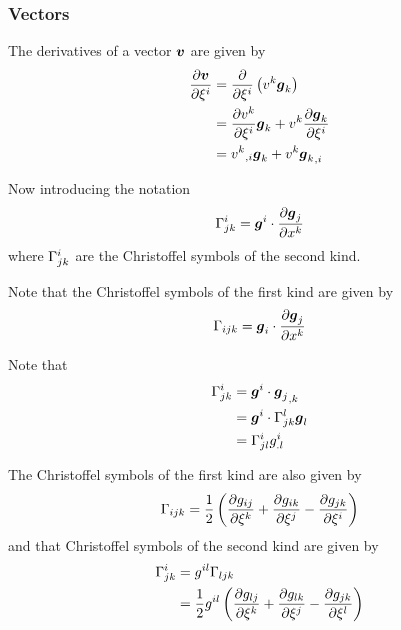 \subsubsection{Vectors}

The derivatives of a vector $\boldsymbol{v}$ are given by
\begin{equation}
  \begin{split}
     \dfrac{\partial \boldsymbol{v}}{\partial \xi^{i}}  &=
     \dfrac{\partial }{\partial \xi^{i}} \left( v^{k}\boldsymbol{g}_{k} \right) \\
    &=  \dfrac{\partial v^{k}}{\partial \xi^{i}} \boldsymbol{g}_{k}+v^{k} \dfrac{\partial \boldsymbol{g}_{k}}{\partial \xi^{i}}  \\
    &=  {v^{k}}_{,i} \boldsymbol{g}_{k}+v^{k} {\boldsymbol{g}_{k}}_{,i} 
  \end{split}
\end{equation}

Now introducing the notation
\begin{equation}
   \Gamma^{i}_{jk}  = \boldsymbol{g}^{i}\cdot \dfrac{\partial \boldsymbol{g}_{j}}{\partial x^{k}} 
\end{equation}
where $ \Gamma^{i}_{jk} $ are the Christoffel symbols of the second
kind. 

Note that the Christoffel symbols of the first kind are given by
\begin{equation}
   \Gamma_{ijk}  = \boldsymbol{g}_{i}\cdot \dfrac{\partial \boldsymbol{g}_{j}}{\partial x^{k}} 
\end{equation}

Note that
\begin{equation}
  \begin{split}
     \Gamma^{i}_{jk}  &= \boldsymbol{g}^{i}\cdot {\ensuremath{\boldsymbol{g}}_{j}}_{,k}  \\
    &=\boldsymbol{g}^{i}\cdot \Gamma^{l}_{jk} \boldsymbol{g}_{l} \\
    &=  \Gamma^{i}_{jl} g^{i}_{.l} 
  \end{split}
\end{equation}

The Christoffel symbols of the first kind are also given by
\begin{equation}
   \Gamma_{ijk} =\frac{1}{2}\left(  \dfrac{\partial g_{ij}}{\partial \xi^{k}} + \dfrac{\partial g_{ik}}{\partial \xi^{j}} - \dfrac{\partial g_{jk}}{\partial \xi^{i}}  \right)
\end{equation}
and that Christoffel symbols of the second kind are given by
\begin{equation}
  \begin{split}
     \Gamma^{i}_{jk}  &= g^{il} \Gamma_{ljk}  \\
    &= \frac{1}{2}g^{il}\left(  \dfrac{\partial g_{lj}}{\partial \xi^{k}} + \dfrac{\partial g_{lk}}{\partial \xi^{j}} - \dfrac{\partial g_{jk}}{\partial \xi^{l}}  \right) 
  \end{split}
\end{equation}

